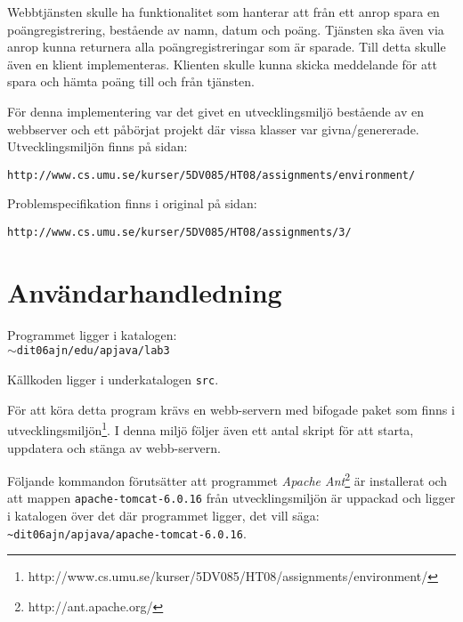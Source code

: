 \documentclass[a4paper, 12pt]{article}
\def\pathtocode{$\sim$dit06ajn/edu/apjava/lab3}
\begin{document}
Webbtjänsten skulle ha funktionalitet som hanterar att från ett anrop
spara en poängregistrering, bestående av namn, datum och
poäng. Tjänsten ska även via anrop kunna returnera alla
poäng\-registreringar som är sparade. Till detta skulle även en klient
implementeras. Klienten skulle kunna skicka meddelande för att spara
och hämta poäng till och från tjänsten.

För denna implementering var det givet en utvecklingsmiljö bestående
av en webbserver och ett påbörjat projekt där vissa klasser var
givna/genererade. Utvecklingsmiljön finns på sidan:\\
\begin{footnotesize}
\verb!http://www.cs.umu.se/kurser/5DV085/HT08/assignments/environment/!
\end{footnotesize}

Problemspecifikation finns i original på sidan:\\
\begin{footnotesize}
\verb!http://www.cs.umu.se/kurser/5DV085/HT08/assignments/3/!
\end{footnotesize}

\section{Användarhandledning}\label{Anvandarhandledning}

Programmet ligger i katalogen:\\
\texttt{\pathtocode}

Källkoden ligger i underkatalogen \verb!src!.

För att köra detta program krävs en webb-servern med bifogade paket
som finns i
utvecklingsmiljön\footnote{http://www.cs.umu.se/kurser/5DV085/HT08/assignments/environment/}.
I denna miljö följer även ett antal skript för att starta,
uppdatera och stänga av webb-servern.

Följande kommandon förutsätter att programmet \textit{Apache
  Ant}\footnote{http://ant.apache.org/} är installerat och att mappen
\verb!apache-tomcat-6.0.16!  från utvecklingsmiljön är uppackad och
ligger i katalogen över det där programmet ligger, det vill säga:
\verb!~dit06ajn/apjava/apache-tomcat-6.0.16!.
\end{document}
